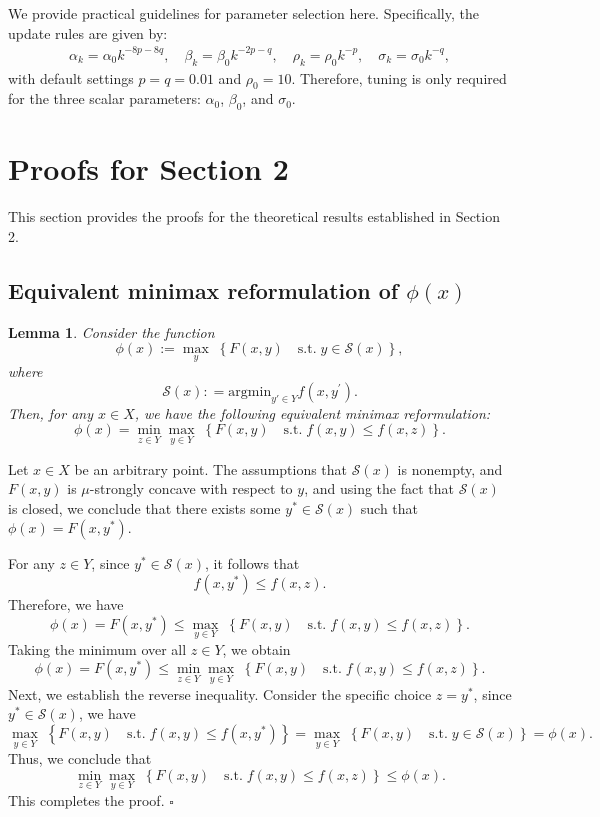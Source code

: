 \documentclass{article}
\newtheorem{lemma}[theorem]{Lemma}
\newenvironment{proof}[1][Proof]{\par
	\normalfont\topsep6pt\relax
	\trivlist\item[\hskip\labelsep\itshape #1.]\ignorespaces
}{%
	\hfill\ensuremath{\square}\endtrivlist
}
\begin{document}
    We provide practical guidelines for parameter selection here. Specifically, the update rules are given by:
    \begin{align*}
    \alpha_{k} = \alpha_0 k^{-8p - 8q}, \quad
    \beta_k = \beta_0 k^{-2p - q}, \quad
    \rho_k = \rho_0 k^{-p}, \quad
    \sigma_k = \sigma_0 k^{-q},
    \end{align*}
    with default settings $p = q = 0.01$ and $\rho_0 = 10$. Therefore, tuning is only required for the three scalar parameters: $\alpha_0$, $\beta_0$, and $\sigma_0$.
    
 
\setcounter{theorem}{0} 
\section{Proofs for Section 2}\label{proofofreformulation}

This section provides the proofs for the theoretical results established in Section 2.

\subsection{Equivalent minimax reformulation of $\phi(x)$}\label{equivalentphi}
\begin{lemma}
    Consider the function
    $$\phi(x) := \max_{y}\; \left\{ F(x, y) \quad \text{s.t.} \; y \in \mathcal{S}(x) \right\},$$ where $$ \mathcal{S}(x): =\mathrm{argmin}_{y' \in Y} f(x, y^\prime).$$ 
    Then, for any $x \in X$, we have the following equivalent minimax reformulation:
    \[
    \phi(x) =\min_{ z\in {Y} } \max_{y\in {Y}}\; \left\{ F(x, y) \quad \text{s.t.} \; f(x,y)\le f(x,z) \right\}.
    \]
\end{lemma}
\begin{proof}
Let $x \in X$ be an arbitrary point. The assumptions that $\mathcal{S}(x)$ is nonempty, and $F(x,y)$ is $\mu$-strongly concave with respect to $y$, and using the fact that $\mathcal{S}(x)$ is closed, we conclude that there exists some $y^*\in \mathcal{S}(x)$ such that $\phi(x) = F(x, y^*)$.

For any $z \in Y$, since $y^*\in \mathcal{S}(x)$, it follows that $$f(x, y^*) \le f(x,z).$$ 
Therefore, we have
\[
\phi(x) =F(x, y^*) \le \max_{y\in {Y}}\; \left\{ F(x, y) \quad \text{s.t.} \; f(x,y)\le f(x,z) \right\}. 
\]
Taking the minimum over all $z \in Y$, we obtain 
\[
\phi(x) = F(x, y^*) \le \min_{ z\in {Y} } \max_{y\in {Y}}\; \left\{ F(x, y) \quad \text{s.t.} \; f(x,y)\le f(x,z) \right\}. 
\]
Next, we establish the reverse inequality. Consider the specific choice $z = y^*$, since $y^* \in \mathcal{S}(x)$, we have
\[
\max_{y\in {Y}}\; \left\{ F(x, y) \quad \text{s.t.} \; f(x,y)\le f(x,y^*) \right\} = \max_{y \in Y}\; \left\{ F(x, y) \quad \text{s.t.} \; y \in \mathcal{S}(x) \right\} = \phi(x).
\]
Thus, we conclude that
\[
\min_{ z\in {Y} }\max_{y\in {Y}}\; \left\{ F(x, y) \quad \text{s.t.} \; f(x,y)\le f(x,z) \right\} \le \phi(x).
\]
This completes the proof.
\end{proof}
\end{document}
